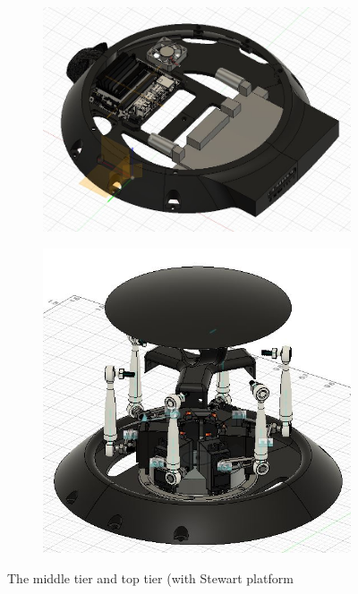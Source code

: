 \documentclass[a4paper, 10pt]{article}
\begin{document}
		\begin{figure}[h]
			\centering
			\begin{subfigure}[h]{0.44\textwidth}
				\centering
				\includegraphics[width=\textwidth]{Photos/rover_middle}
			\end{subfigure}
			\hfill
			\begin{subfigure}[h]{0.55\textwidth}
				\centering
				\includegraphics[width=\textwidth]{Photos/rover_top}
			\end{subfigure}
			\centering
			\caption{The middle tier and top tier (with Stewart platform}
			\label{upper_parts}
		\end{figure}
\end{document}
